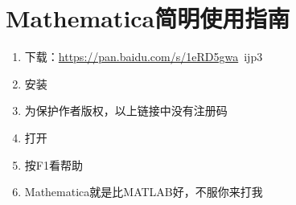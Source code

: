 \chapter{Mathematica简明使用指南}
\begin{enumerate}
\item 下载：\url{https://pan.baidu.com/s/1eRD5gwa}\ ijp3
\item 安装
\item 为保护作者版权，以上链接中没有注册码
\item 打开
\item 按F1看帮助
\item Mathematica就是比MATLAB好，不服你来打我
\end{enumerate}
